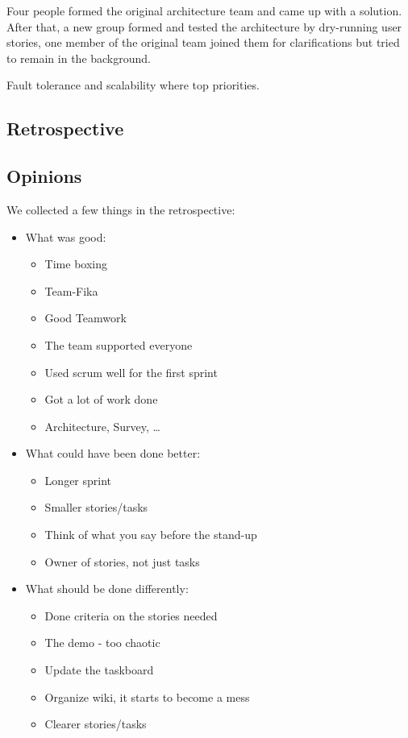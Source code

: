 \documentclass[11pt,a4paper]{article}
\begin{document}
Four people formed the original architecture team and came up with a solution. 
After that, a new group formed and tested the architecture by dry-running user stories, 
one member of the original team joined them for clarifications but tried to remain in the background.

Fault tolerance and scalability where top priorities.

\subsection{Retrospective}

\subsection{Opinions}
We collected a few things in the retrospective:
\begin{itemize}
 \item What was good:
  \begin{itemize}
   \item Time boxing
   \item Team-Fika
   \item Good Teamwork
   \item The team supported everyone
   \item Used scrum well for the first sprint
   \item Got a lot of work done
   \item Architecture, Survey, \dots
  \end{itemize}
 \item What could have been done better:
  \begin{itemize}
   \item Longer sprint
   \item Smaller stories/tasks
   \item Think of what you say before the stand-up
   \item Owner of stories, not just tasks
  \end{itemize}
 \item What should be done differently:
  \begin{itemize}
   \item Done criteria on the stories needed
   \item The demo - too chaotic
   \item Update the taskboard
   \item Organize wiki, it starts to become a mess
   \item Clearer stories/tasks
  \end{itemize}
\end{itemize}
\end{document}
